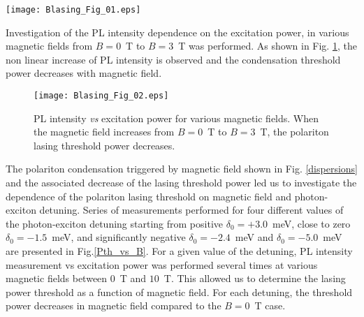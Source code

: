 \documentclass[amssymb,prb,twocolumn,floats,amsmath]{revtex4}
\begin{document}
\begin{figure*}
    \texttt{[image: Blasing\_Fig\_01.eps]}
  \caption{Comparison of two effects inducing polariton lasing: the increase of excitation power and the increase of magnetic field. (a)-(d) Angle resolved PL measurement of the polariton condensation in zero magnetic field when increasing the excitation power; the linear color scale is different for each panel. Panels (e) and (f) present the characteristic nonlinear intensity increase and linewidth narrowing at threshold. (g)-(j) Angle resolved PL measurements of the polariton condensation triggered by magnetic field under fixed excitation power; the same linear color scale is used for panels (g)-(j). Panels (k)  and (l) present the characteristic nonlinear intensity increase and linewidth narrowing at threshold. In panel (l), for $1$~T$\leq B \leq 1.6$~T, the emission at zero angle results from the contribution of two lines with comparable intensity: a narrow one from condensed polaritons and a broad one from uncondensed polaritons, which intensity relative to the narrow line becomes negligibly small above $B \approx 2$~T.}
  \label{dispersions}
\end{figure*}

Investigation of the PL intensity dependence on the excitation power, in various magnetic fields from $B=0$~T to $B=3$~T was performed. As shown in Fig. \ref{I-PvsB}, the non linear increase of PL intensity is observed and the condensation threshold power decreases with magnetic field.



\begin{figure}
    \texttt{[image: Blasing\_Fig\_02.eps]}
  \caption{PL intensity \emph{vs} excitation power for various magnetic fields. When the magnetic field increases from $B=0$~T to $B=3$~T, the polariton lasing threshold power decreases.}
  \label{I-PvsB}
\end{figure}

The polariton condensation triggered by magnetic field shown in Fig. \ref{dispersions} and the associated decrease of the lasing threshold power led us to investigate the dependence of the polariton lasing threshold on  magnetic field and photon-exciton detuning. Series of measurements performed for four different values of the photon-exciton detuning starting from positive $\delta_0 = +3.0$~meV, close to zero $\delta_0 = -1.5$~meV, and significantly negative $\delta_0 = -2.4$~meV and $\delta_0 = -5.0$~meV are presented in Fig.\ref{Pth_vs_B}. For a given value of the detuning, PL intensity measurement vs excitation power was performed several times at various magnetic fields between $0$~T and $10$~T. This allowed us to determine the lasing power threshold as a function of magnetic field. For each detuning, the threshold power decreases in magnetic field compared to the $B=0$~T case.
\end{document}
